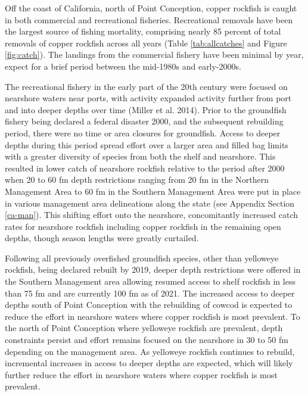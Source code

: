 \documentclass[11pt,
  english,
  a4paper,
]{article}
\begin{document}
\leavevmode\tagmcend\tagstructend


Off the coast of California, north of Point Conception, copper rockfish is caught in both commercial and recreational fisheries. Recreational removals have been the largest source of fishing mortality, comprising nearly 85 percent of total removals of copper rockfish across all years (Table \ref{tab:allcatches} and Figure \ref{fig:catch}). The landings from the commercial fishery have been minimal by year, expect for a brief period between the mid-1980s and early-2000s.

\leavevmode\tagmcend\tagstructend\par


The recreational fishery in the early part of the 20th century were focused on nearshore waters near ports, with activity expanded activity further from port and into deeper depths over time {(Miller et al. 2014)\leavevmode\tagmcend\tagstructend}. Prior to the groundfish fishery being declared a federal disaster 2000, and the subsequent rebuilding period, there were no time or area closures for groundfish. Access to deeper depths during this period spread effort over a larger area and filled bag limits with a greater diversity of species from both the shelf and nearshore. This resulted in lower catch of nearshore rockfish relative to the period after 2000 when 20 to 60 fm depth restrictions ranging from 20 fm in the Northern Management Area to 60 fm in the Southern Management Area were put in place in various management area delineations along the state (see Appendix Section \ref{ca-man}). This shifting effort onto the nearshore, concomitantly increased catch rates for nearshore rockfish including copper rockfish in the remaining open depths, though season lengths were greatly curtailed.

\leavevmode\tagmcend\tagstructend\par


Following all previously overfished groundfish species, other than yelloweye rockfish, being declared rebuilt by 2019, deeper depth restrictions were offered in the Southern Management area allowing resumed access to shelf rockfish in less than 75 fm and are currently 100 fm as of 2021. The increased access to deeper depths south of Point Conception with the rebuilding of cowcod is expected to reduce the effort in nearshore waters where copper rockfish is most prevalent. To the north of Point Conception where yelloweye rockfish are prevalent, depth constraints persist and effort remains focused on the nearshore in 30 to 50 fm depending on the management area. As yelloweye rockfish continues to rebuild, incremental increases in access to deeper depths are expected, which will likely further reduce the effort in nearshore waters where copper rockfish is most prevalent.
\end{document}
